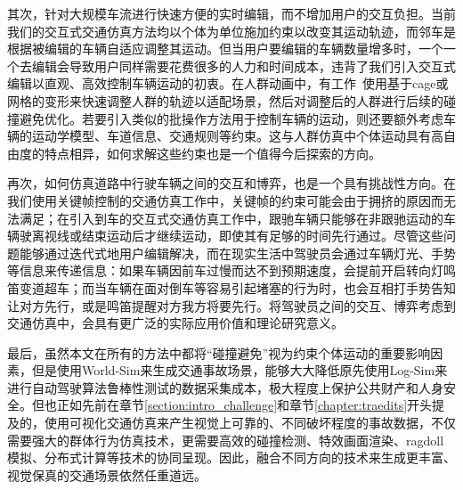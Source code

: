 其次，针对大规模车流进行快速方便的实时编辑，而不增加用户的交互负担。当前我们的交互式交通仿真方法均以个体为单位施加约束以改变其运动轨迹，而邻车是根据被编辑的车辆自适应调整其运动。但当用户要编辑的车辆数量增多时，一个一个去编辑会导致用户同样需要花费很多的人力和时间成本，违背了我们引入交互式编辑以直观、高效控制车辆运动的初衷。在人群动画中，有工作~\cite{kim2014interactive, zhang2020crowd}使用基于cage或网格的变形来快速调整人群的轨迹以适配场景，然后对调整后的人群进行后续的碰撞避免优化。若要引入类似的批操作方法用于控制车辆的运动，则还要额外考虑车辆的运动学模型、车道信息、交通规则等约束。这与人群仿真中个体运动具有高自由度的特点相异，如何求解这些约束也是一个值得今后探索的方向。

再次，如何仿真道路中行驶车辆之间的交互和博弈，也是一个具有挑战性方向。在我们使用关键帧控制的交通仿真工作中，关键帧的约束可能会由于拥挤的原因而无法满足；在引入到车的交互式交通仿真工作中，跟驰车辆只能够在非跟驰运动的车辆驶离视线或结束运动后才继续运动，即使其有足够的时间先行通过。尽管这些问题能够通过迭代式地用户编辑解决，而在现实生活中驾驶员会通过车辆灯光、手势等信息来传递信息：如果车辆因前车过慢而达不到预期速度，会提前开启转向灯鸣笛变道超车；而当车辆在面对倒车等容易引起堵塞的行为时，也会互相打手势告知让对方先行，或是鸣笛提醒对方我方将要先行。将驾驶员之间的交互、博弈考虑到交通仿真中，会具有更广泛的实际应用价值和理论研究意义。

最后，虽然本文在所有的方法中都将“碰撞避免”视为约束个体运动的重要影响因素，但是使用World-Sim来生成交通事故场景，能够大大降低原先使用Log-Sim来进行自动驾驶算法鲁棒性测试的数据采集成本，极大程度上保护公共财产和人身安全。但也正如先前在章节\ref{section:intro_challenge}和章节\ref{chapter:traedits}开头提及的，使用可视化交通仿真来产生视觉上可靠的、不同破坏程度的事故数据，不仅需要强大的群体行为仿真技术，更需要高效的碰撞检测、特效画面渲染、ragdoll模拟、分布式计算等技术的协同呈现。因此，融合不同方向的技术来生成更丰富、视觉保真的交通场景依然任重道远。
